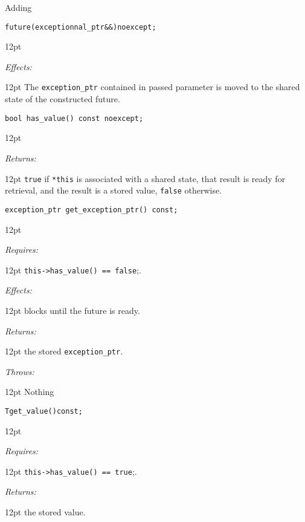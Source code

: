 \documentclass[a4paper,10pt]{article}
\newcommand{\cpp}[1]{\lstinline{#1}}
\newcommand{\wordingItem}[1]{\noindent\textit{#1:}}
\newenvironment{wordingPara}{\begin{adjustwidth}{12pt}{}}{\end{adjustwidth}}
\newenvironment{Effects}{\wordingItem{Effects}\vspace{7pt}\noindent\begin{adjustwidth}{12pt}{}}{\vspace{7pt}\end{adjustwidth}}
\newenvironment{Throws}{\wordingItem{Throws}\vspace{7pt}\noindent\begin{adjustwidth}{12pt}{}}{\vspace{7pt}\end{adjustwidth}}
\newenvironment{Returns}{\wordingItem{Returns}\vspace{7pt}\noindent\begin{adjustwidth}{12pt}{}}{\vspace{7pt}\end{adjustwidth}}
\newenvironment{Requires}{\wordingItem{Requires}\vspace{7pt}\noindent\begin{adjustwidth}{12pt}{}}{\vspace{7pt}\end{adjustwidth}}
\newcommand{\suppress}[1]{\colorbox{suppress_color}{#1}}
\newcommand{\update}[1]{\colorbox{update_color}{#1}}
\begin{document}
\noindent
Adding

\begin{alltt}
\update{future(exceptionnal_ptr&&) noexcept; }
\end{alltt}

\begin{wordingPara}

\begin{Effects}
\update{The \cpp{exception_ptr} contained in passed parameter is moved to the shared state of the constructed future. }
\end{Effects}

\end{wordingPara}

\begin{lstlisting}[xleftmargin=0pt]
bool has_value() const noexcept;
\end{lstlisting}

\begin{wordingPara}

\begin{Returns} \cpp{true} if \cpp{*this} is associated with a shared state, that result is ready for retrieval, and the result is a stored value, \cpp{false} otherwise.
\end{Returns}

\end{wordingPara}
\begin{lstlisting}[xleftmargin=0pt]
exception_ptr get_exception_ptr() const;
\end{lstlisting}
\begin{wordingPara}

\begin{Requires}
\suppress{\cpp{this->has_value() == false}};.
\end{Requires}

\begin{Effects}
blocks until the future is ready.
\end{Effects}

\begin{Returns}
the stored \cpp{exception_ptr}.
\end{Returns}

\begin{Throws}
Nothing 
\end{Throws}

\end{wordingPara}
\begin{alltt}
\suppress{T get_value() const;}
\end{alltt}
\begin{wordingPara}

\begin{Requires}
\suppress{\cpp{this->has_value() == true};.}
\end{Requires}

\begin{Returns}
\suppress{the stored value. }
\end{Returns}

\end{wordingPara}
\end{document}
